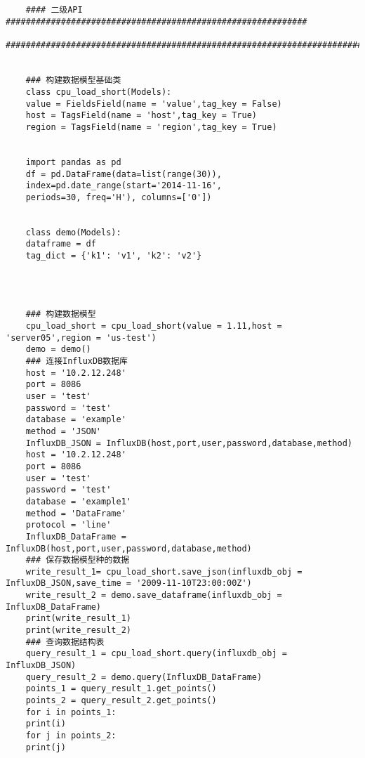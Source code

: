 \documentclass[cn,hazy,blue,14pt,screen]{elegantnote}
\begin{document}
\begin{lstlisting}
	
	
	#### 二级API ############################################################
	#########################################################################
	
	
	### 构建数据模型基础类
	class cpu_load_short(Models):
	value = FieldsField(name = 'value',tag_key = False)
	host = TagsField(name = 'host',tag_key = True)
	region = TagsField(name = 'region',tag_key = True)
	
	
	import pandas as pd 
	df = pd.DataFrame(data=list(range(30)),
	index=pd.date_range(start='2014-11-16',
	periods=30, freq='H'), columns=['0'])
	
	
	class demo(Models):
	dataframe = df
	tag_dict = {'k1': 'v1', 'k2': 'v2'}
	
	
	
	
	### 构建数据模型
	cpu_load_short = cpu_load_short(value = 1.11,host = 'server05',region = 'us-test')
	demo = demo()
	### 连接InfluxDB数据库
	host = '10.2.12.248'
	port = 8086
	user = 'test'
	password = 'test'
	database = 'example'
	method = 'JSON'
	InfluxDB_JSON = InfluxDB(host,port,user,password,database,method)
	host = '10.2.12.248'
	port = 8086
	user = 'test'
	password = 'test'
	database = 'example1'
	method = 'DataFrame'
	protocol = 'line'
	InfluxDB_DataFrame = InfluxDB(host,port,user,password,database,method)
	### 保存数据模型种的数据
	write_result_1= cpu_load_short.save_json(influxdb_obj = InfluxDB_JSON,save_time = '2009-11-10T23:00:00Z')
	write_result_2 = demo.save_dataframe(influxdb_obj = InfluxDB_DataFrame)
	print(write_result_1)
	print(write_result_2)
	### 查询数据结构表
	query_result_1 = cpu_load_short.query(influxdb_obj = InfluxDB_JSON)
	query_result_2 = demo.query(InfluxDB_DataFrame)
	points_1 = query_result_1.get_points()
	points_2 = query_result_2.get_points()
	for i in points_1:
	print(i)
	for j in points_2:
	print(j)
\end{lstlisting}
\end{document}
